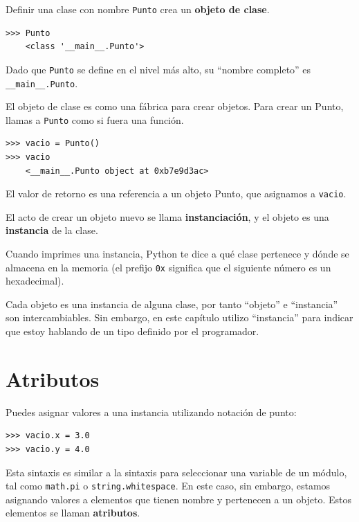 \documentclass[10pt]{book}
\begin{document}
Definir una clase con nombre {\tt Punto} crea un {\bf objeto de clase}.

\begin{verbatim}
>>> Punto
    <class '__main__.Punto'>
\end{verbatim}
%
Dado que {\tt Punto} se define en el nivel más alto, su ``nombre
completo'' es \verb"__main__.Punto".

El objeto de clase es como una fábrica para crear objetos.  Para crear un
Punto, llamas a {\tt Punto} como si fuera una función.

\begin{verbatim}
>>> vacio = Punto()
>>> vacio
    <__main__.Punto object at 0xb7e9d3ac>
\end{verbatim}
%
El valor de retorno es una referencia a un objeto Punto, que
asignamos a {\tt vacio}.

El acto de crear un objeto nuevo se llama
{\bf instanciación}, y el objeto es una {\bf instancia} de
la clase.

Cuando imprimes una instancia, Python te dice a qué clase
pertenece y dónde se almacena en la memoria (el prefijo
{\tt 0x} significa que el siguiente número es un hexadecimal).

Cada objeto es una instancia de alguna clase, por tanto ``objeto'' e
``instancia'' son intercambiables.  Sin embargo, en este capítulo utilizo
``instancia'' para indicar que estoy hablando de un tipo definido por el
programador.


\section{Atributos}
\label{attributes}

Puedes asignar valores a una instancia utilizando notación de punto:

\begin{verbatim}
>>> vacio.x = 3.0
>>> vacio.y = 4.0
\end{verbatim}
%
Esta sintaxis es similar a la sintaxis para seleccionar una variable de un
módulo, tal como {\tt math.pi} o {\tt string.whitespace}.  En este caso,
sin embargo, estamos asignando valores a elementos que tienen nombre y pertenecen a un objeto.
Estos elementos se llaman {\bf atributos}.

\end{document}
